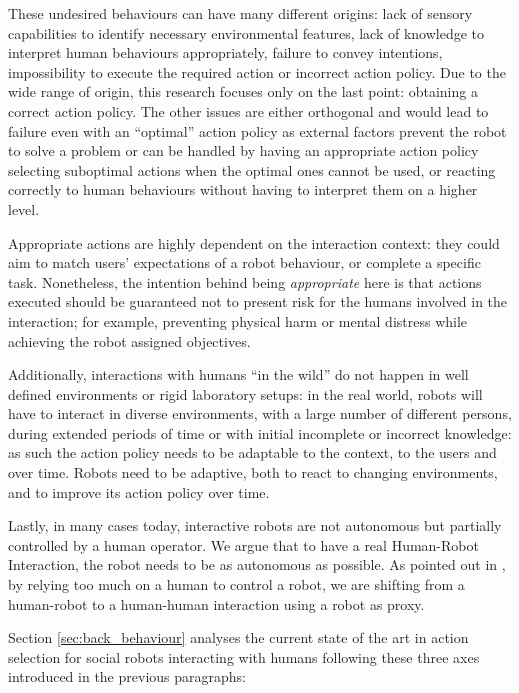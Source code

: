     These undesired behaviours can have many different origins: lack of sensory capabilities to identify necessary environmental features, lack of knowledge to interpret human behaviours appropriately, failure to convey intentions, impossibility to execute the required action or incorrect action policy. Due to the wide range of origin, this research focuses only on the last point: obtaining a correct action policy. The other issues are either orthogonal and would lead to failure even with an ``optimal'' action policy as external factors prevent the robot to solve a problem or can be handled by having an appropriate action policy selecting suboptimal actions when the optimal ones cannot be used, or reacting correctly to human behaviours without having to interpret them on a higher level. 
    
    Appropriate actions are highly dependent on the interaction context: they could aim to match users' expectations of a robot behaviour, or complete a specific task. Nonetheless, the intention behind being \textit{appropriate} here is that actions executed should be guaranteed not to present risk for the humans involved in the interaction; for example, preventing physical harm or mental distress while achieving the robot assigned objectives.

    Additionally, interactions with humans ``in the wild'' \cite{belpaeme2012multimodal} do not happen in well defined environments or rigid laboratory setups: in the real world, robots will have to interact in diverse environments, with a large number of different persons, during extended periods of time or with initial incomplete or incorrect knowledge: as such the action policy needs to be adaptable to the context, to the users and over time. Robots need to be adaptive, both to react to changing environments, and to improve its action policy over time.

    Lastly, in many cases today, interactive robots are not autonomous but partially controlled by a human operator. We argue that to have a real Human-Robot Interaction, the robot needs to be as autonomous as possible. As pointed out in \citet{baxter2016characterising}, by relying too much on a human to control a robot, we are shifting from a human-robot to a human-human interaction using a robot as proxy. 
    
    Section \ref{sec:back_behaviour} analyses the current state of the art in action selection for social robots interacting with humans following these three axes introduced in the previous paragraphs:

